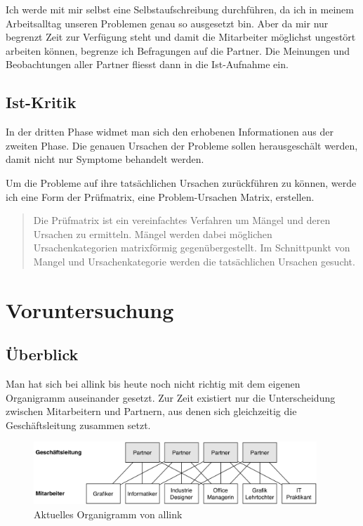 Ich werde mit mir selbst eine Selbstaufschreibung durchführen, da ich in meinem 
Arbeitsalltag unseren Problemen genau so ausgesetzt bin. Aber da mir nur begrenzt
Zeit zur Verfügung steht und damit die Mitarbeiter möglichst ungestört arbeiten
können, begrenze ich Befragungen auf die Partner. Die Meinungen und Beobachtungen
aller Partner fliesst dann in die Ist-Aufnahme ein.

\subsection{Ist-Kritik}
In der dritten Phase widmet man sich den erhobenen Informationen aus der zweiten Phase. 
Die genauen Ursachen der Probleme sollen herausgeschält werden, damit nicht nur 
Symptome behandelt werden. 

Um die Probleme auf ihre tatsächlichen Ursachen zurückführen zu können,
werde ich eine Form der Prüfmatrix, eine Problem-Ursachen Matrix, erstellen.

\begin{quotation}
    Die Prüfmatrix ist ein vereinfachtes Verfahren um Mängel und deren Ursachen 
    zu ermitteln. Mängel werden dabei möglichen Ursachenkategorien matrixförmig 
    gegenübergestellt. Im Schnittpunkt von Mangel und Ursachenkategorie werden 
    die tatsächlichen Ursachen gesucht.\cite{schmidt2000methode}
\end{quotation}

\section{Voruntersuchung}
\subsection{Überblick}
Man hat sich bei allink bis heute noch nicht richtig mit dem eigenen Organigramm
auseinander gesetzt. Zur Zeit existiert nur die Unterscheidung zwischen Mitarbeitern 
und Partnern, aus denen sich gleichzeitig die Geschäftsleitung zusammen setzt.

\begin{figure}[htbp]
\begin{center}
\includegraphics[width=0.95\textwidth,angle=0]{./bilder/ist_organigramm.pdf}
\caption{Aktuelles Organigramm von allink}
\label{pic:ist_organigramm}
\end{center}
\end{figure}


